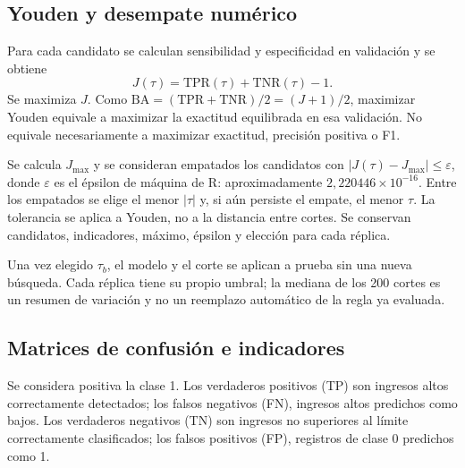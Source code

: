 \documentclass[11pt,a4paper]{article}
\begin{document}
\subsection{Youden y desempate numérico}
Para cada candidato se calculan sensibilidad y especificidad en validación y se obtiene
\begin{equation}\label{eq:youden}
J(\tau)=\mathrm{TPR}(\tau)+\mathrm{TNR}(\tau)-1.
\end{equation}
Se maximiza $J$. Como $\mathrm{BA}=(\mathrm{TPR}+\mathrm{TNR})/2=(J+1)/2$, maximizar Youden equivale a maximizar la exactitud equilibrada en esa validación. No equivale necesariamente a maximizar exactitud, precisión positiva o F1.

Se calcula $J_{\max}$ y se consideran empatados los candidatos con $|J(\tau)-J_{\max}|\leq\varepsilon$, donde $\varepsilon$ es el épsilon de máquina de R: aproximadamente $2,220446\times10^{-16}$. Entre los empatados se elige el menor $|\tau|$ y, si aún persiste el empate, el menor $\tau$. La tolerancia se aplica a Youden, no a la distancia entre cortes. Se conservan candidatos, indicadores, máximo, épsilon y elección para cada réplica.

Una vez elegido $\tau_b$, el modelo y el corte se aplican a prueba sin una nueva búsqueda. Cada réplica tiene su propio umbral; la mediana de los 200 cortes es un resumen de variación y no un reemplazo automático de la regla ya evaluada.

\subsection{Matrices de confusión e indicadores}
Se considera positiva la clase 1. Los verdaderos positivos (TP) son ingresos altos correctamente detectados; los falsos negativos (FN), ingresos altos predichos como bajos. Los verdaderos negativos (TN) son ingresos no superiores al límite correctamente clasificados; los falsos positivos (FP), registros de clase 0 predichos como 1.
\end{document}
